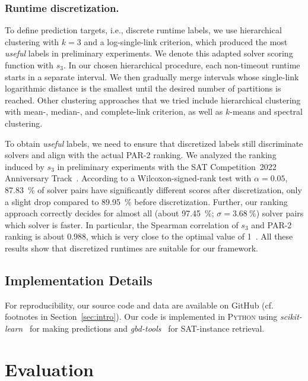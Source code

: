 \documentclass[runningheads]{llncs}
\begin{document}
\subsubsection{Runtime discretization.}

To define prediction targets, i.e., discrete runtime labels, we use hierarchical clustering with $k = 3$ and a log-single-link criterion, which produced the most \emph{useful} labels in preliminary experiments.
We denote this adapted solver scoring function with $s_3$.
In our chosen hierarchical procedure, each non-timeout runtime starts in a separate interval.
We then gradually merge intervals whose single-link logarithmic distance is the smallest until the desired number of partitions is reached.
Other clustering approaches that we tried include hierarchical clustering with mean-, median-, and complete-link criterion, as well as $k$-means and spectral clustering.

To obtain \emph{useful} labels, we need to ensure that discretized labels still discriminate solvers and align with the actual PAR-2 ranking.
We analyzed the ranking induced by $s_3$ in preliminary experiments with the SAT Competition~2022 Anniversary Track~\cite{sat2022}.
According to a Wilcoxon-signed-rank test with $\alpha = 0.05$, \SI{87.83}{\%} of solver pairs have significantly different scores after discretization, only a slight drop compared to \SI{89.95}{\%} before discretization.
Further, our ranking approach correctly decides for almost all (about \SI{97.45}{\%}; $\sigma = \SI{3.68}{\%}$) solver pairs which solver is faster.
In particular, the Spearman correlation of $s_3$ and PAR-2 ranking is about \SI{0.988}{}, which is very close to the optimal value of 1~\cite{de2016comparing}.
All these results show that discretized runtimes are suitable for our framework.

\subsection{Implementation Details}

For reproducibility, our source code and data are available on GitHub (cf. footnotes in Section~\ref{sec:intro}).
Our code is implemented in \textsc{Python} using \emph{scikit-learn}~\cite{scikit-learn} for making predictions and \emph{gbd-tools}~\cite{IserS18} for SAT-instance retrieval.

\section{Evaluation}
\label{sec:eval}
\end{document}
